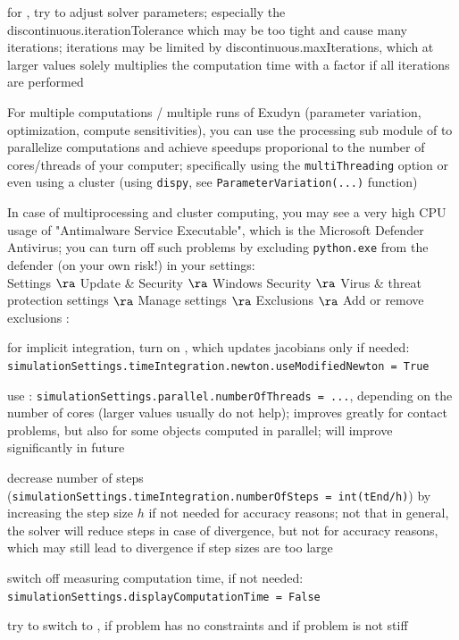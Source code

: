   \item for , try to adjust solver parameters; especially the discontinuous.iterationTolerance which may be too tight and cause many iterations; iterations may be limited by discontinuous.maxIterations, which at larger values solely multiplies the computation time with a factor if all iterations are performed
  \item For multiple computations / multiple runs of Exudyn (parameter variation, optimization, compute sensitivities), you can use the processing sub module of \codeName to parallelize computations and achieve speedups proporional to the number of cores/threads of your computer; specifically using the \texttt{multiThreading} option or even using a cluster (using \texttt{dispy}, see \texttt{ParameterVariation(...)} function)
  \item In case of multiprocessing and cluster computing, you may see a very high CPU usage of "Antimalware Service Executable", which is the Microsoft Defender Antivirus; you can turn off such problems by excluding \texttt{python.exe} from the defender (on your own risk!) in your settings:\\
  Settings $\ra$ Update \& Security $\ra$ Windows Security $\ra$ Virus \& threat protection settings $\ra$ Manage settings $\ra$ Exclusions $\ra$ Add or remove exclusions 
\ei
%
:
\bi
  \item for implicit integration, turn on , which updates jacobians only if needed: \texttt{simulationSettings.timeIntegration.newton.useModifiedNewton = True}
  \item use : \texttt{simulationSettings.parallel.numberOfThreads = ...}, depending on the number of cores (larger values usually do not help); improves greatly for contact problems, but also for some objects computed in parallel; will improve significantly in future
  \item decrease number of steps (\texttt{simulationSettings.timeIntegration.numberOfSteps = int(tEnd/h)}) by increasing the step size $h$ if not needed for accuracy reasons; not that in general, the solver will reduce steps in case of divergence, but not for accuracy reasons, which may still lead to divergence if step sizes are too large
  \item switch off measuring computation time, if not needed: \texttt{simulationSettings.displayComputationTime = False}
  \item try to switch to , if problem has no constraints and if problem is not stiff
